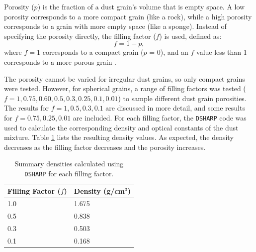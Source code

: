 








Porosity ($p$) is the fraction of a dust grain's volume that is empty space. A low porosity corresponds to a more compact grain (like a rock), while a high porosity corresponds to a grain with more empty space (like a sponge). Instead of specifying the porosity directly, the filling factor ($f$) is used, defined as:
\begin{equation}
 f = 1 - p,
    \label{eq: filling factor}
\end{equation}
\noindent where $f=1$ corresponds to a compact grain ($p$ = 0), and an $f$ value less than 1 corresponds to a more porous grain \citep{Zhang2023}. 

The porosity cannot be varied for irregular dust grains, so only compact grains were tested. However, for spherical grains, a range of filling factors was tested ($f = 1, 0.75, 0.60, 0.5, 0.3, 0.25, 0.1, 0.01$) to sample different dust grain porosities. The results for $f = 1, 0.5, 0.3, 0.1$ are discussed in more detail, and some results for $f = 0.75, 0.25, 0.01$ are included. For each filling factor, the \texttt{DSHARP} code was used to calculate the corresponding density and optical constants of the dust mixture. Table \ref{tab:dsharp_density} lists  the resulting density values. As expected, the density decreases as the filling factor decreases and the porosity increases.  




\begin{table}[h!]
\centering
\caption{Summary densities calculated using \texttt{DSHARP} for each filling factor.}
\begin{tabular}{ll}
\toprule
\textbf{Filling Factor (\boldmath$f$)} &
\textbf{Density (g/cm\boldmath$^3$)} \\
\midrule
1.0    & 1.675 \\
0.5 & 0.838 \\
0.3  & 0.503 \\
0.1 & 0.168 \\
\bottomrule
\end{tabular}
\label{tab:dsharp_density}
\end{table}

